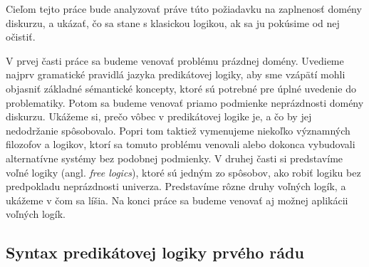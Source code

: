 \documentclass[12pt, letterpaper]{article}
\begin{document}
Cieľom tejto práce bude analyzovať práve túto požiadavku na zaplnenosť domény diskurzu, a ukázať, čo sa stane s klasickou logikou, ak sa ju pokúsime od nej očistiť.\par
V prvej časti práce sa budeme venovať problému prázdnej domény. Uvedieme najprv gramatické pravidlá jazyka predikátovej logiky, aby sme vzápätí mohli objasniť základné sémantické koncepty, ktoré sú potrebné pre úplné uvedenie do problematiky. Potom sa budeme venovať priamo podmienke neprázdnosti domény diskurzu. Ukážeme si, prečo vôbec v predikátovej logike je, a čo by jej nedodržanie spôsobovalo. Popri tom taktiež vymenujeme niekoľko významných filozofov a logikov, ktorí sa tomuto problému venovali alebo dokonca vybudovali alternatívne systémy bez podobnej podmienky. V druhej časti si predstavíme voľné logiky (angl. \textit{free logics}), ktoré sú jedným zo spôsobov, ako robiť logiku bez predpokladu neprázdnosti univerza. Predstavíme rôzne druhy voľných logík, a ukážeme v čom sa líšia. Na konci práce sa budeme venovať aj možnej aplikácii voľných logík.

\subsection{Syntax predikátovej logiky prvého rádu}
\end{document}

